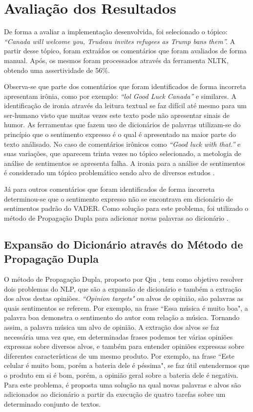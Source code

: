 \chapter{Avaliação dos Resultados}
\label{cap:impl}
De forma a avaliar a implementação desenvolvida, foi selecionado o tópico:
\textit{``Canada will welcome you, Trudeau invites refugees as Trump bans
them''.}
A partir desse tópico, foram extraídos os comentários que foram avaliados de
forma manual. Após, os mesmos foram processados através da ferramenta \ac{NLTK},
obtendo uma assertividade de 56\%.

Observa-se que parte dos comentários que foram identificados de forma
incorreta apresentam irônia, como por exemplo: \textit{``lol Good Luck
Canada''} e similares. A identificação de ironia através da leitura textual se
faz difícil até mesmo para um ser-humano visto que muitas vezes este texto pode
não apresentar sinais de humor. As ferramentas que fazem uso de dicionários de
palavras utilizam-se do princípio que o sentimento expresso é o qual é
apresentado na maior parte do texto análisado. No caso de comentários
irônicos como \textit{``Good luck with that.''} e suas variações, que aparecem
trinta vezes no tópico selecionado, a metologia de análise de sentimentos se
apresenta falha. A ironia para a análise de sentimentos é considerado
um tópico problemático sendo alvo de diversos estudos \cite{DBLP:conf/lrec/StranisciBFP16}.

Já para outros comentários que foram identificados de forma incorreta
determinou-se que o sentimento expresso não se encontrava em dicionário de sentimentos padrão do
\ac{VADER}. Como solução para este problema, foi utilizado o método de
Propagação Dupla para adicionar novas palavras ao dicionário
\cite{Qiu:2011:OWE:1970420.1970422}.

\section{Expansão do Dicionário através do Método de Propagação Dupla}

O método de Propagação Dupla, proposto por Qiu
\cite{Qiu:2011:OWE:1970420.1970422}, tem como objetivo resolver dois
problemas do \ac{NLP}, que são a expansão de dicionário e também a extração dos
alvos destas opiniões. \textit{``Opinion targets"} ou alvos de opinião, são
palavras as quais sentimentos se referem. Por exemplo, na frase ``Essa
música é muito boa", a palavra boa demonstra o sentimento do autor com relação a
música. Tornando assim, a palavra música um alvo de opinião. A extração dos
alvos se faz necessária uma vez que, em determinadas frases podemos ter várias
opiniões expressas sobre diversos alvos, e também para entender opiniões
expressas sobre diferentes características de um mesmo produto. Por exemplo, na
frase ``Este celular é muito bom, porém a bateria dele é péssima", se faz
útil entendermos que o produto em si é bom, porém, a opinião geral sobre a
bateria dele é negativa. Para este problema, é proposta uma solução na qual
novas palavras e alvos são adicionados ao dicionário a partir da execução de quatro tarefas sobre um determinado conjunto de textos.

